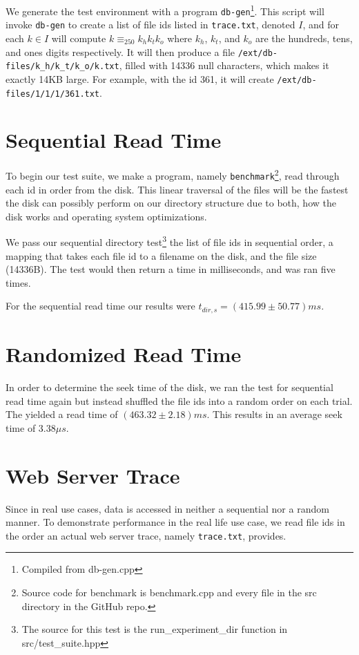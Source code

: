 \documentclass[notitlepage, twocolumn]{article}
\begin{document}
We generate the test environment with a program \verb|db-gen|\footnote{Compiled from db-gen.cpp}.
This script will invoke \verb|db-gen| to create a list of file ids listed in \verb|trace.txt|, denoted $I$, and for each $k\in I$ will compute $k\equiv_{250}k_hk_tk_o$ where $k_h$, $k_t$, and $k_o$ are the hundreds, tens, and ones digits respectively.
It will then produce a file \verb|/ext/db-files/k_h/k_t/k_o/k.txt|, filled with 14336 null characters, which makes it exactly 14KB large.
For example, with the id 361, it will create \verb|/ext/db-files/1/1/1/361.txt|.

\section{Sequential Read Time}

To begin our test suite, we make a program, namely \verb|benchmark|\footnote{Source code for benchmark is benchmark.cpp and every file in the src directory in the GitHub repo.},
read through each id in order from the disk.
This linear traversal of the files will be the fastest the disk can possibly perform on our directory structure due to both, how the disk works and operating system optimizations.

We pass our sequential directory test\footnote{The source for this test is the run\_experiment\_dir function in src/test\_suite.hpp} the list of file ids in sequential order, a mapping that takes each file id to a filename on the disk, and the file size (14336B).
The test would then return a time in milliseconds, and was ran five times.

For the sequential read time our results were $t_{dir,s}=(415.99 \pm 50.77)ms$.

\section{Randomized Read Time}

In order to determine the seek time of the disk, we ran the test for sequential read time again but instead shuffled the file ids into a random order on each trial.
The yielded a read time of $(463.32 \pm 2.18)ms$.
This results in an average seek time of $3.38\mu s$.

\section{Web Server Trace}

Since in real use cases, data is accessed in neither a sequential nor a random manner.
To demonstrate performance in the real life use case, we read file ids in the order an actual web server trace, namely \verb|trace.txt|, provides.
\end{document}
